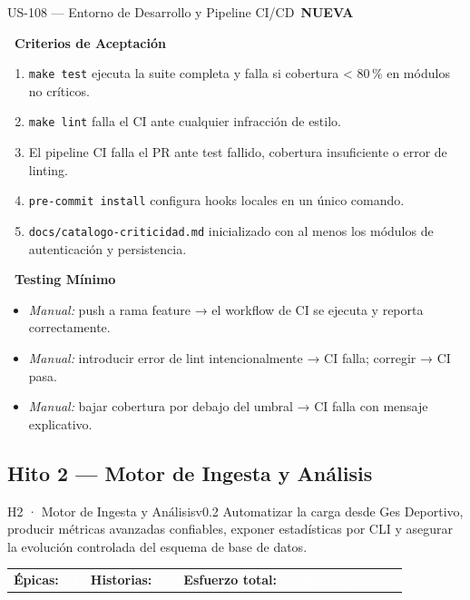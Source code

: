 \documentclass[11pt,a4paper]{article}
\newcommand{\fpath}[1]{\texttt{\small #1}}
\newcommand{\usfield}[2][\;]{%
  \par\vspace{5pt}%
  {\small\textbf{\textcolor{primary}{#2}}}\par\vspace{2pt}%
}
\newcommand{\tagnew}{\,\colorbox{tagnew}{\tiny\bfseries NUEVA}\,}
\begin{document}
\begin{uscard}{US-108 — Entorno de Desarrollo y Pipeline CI/CD \tagnew}
\usfield{\faCheckCircle\ Criterios de Aceptación}
\begin{enumerate}[label=\textcolor{accent}{\textbf{AC\arabic*.}}, nosep, leftmargin=2.2em]
  \item \fpath{make test} ejecuta la suite completa y falla si cobertura < 80\,\% en módulos no críticos.
  \item \fpath{make lint} falla el CI ante cualquier infracción de estilo.
  \item El pipeline CI falla el PR ante test fallido, cobertura insuficiente o error de linting.
  \item \fpath{pre-commit install} configura hooks locales en un único comando.
  \item \fpath{docs/catalogo-criticidad.md} inicializado con al menos los módulos de autenticación y persistencia.
\end{enumerate}

\usfield{\faFlask\ Testing Mínimo}
\begin{itemize}[nosep, leftmargin=1.6em]
  \item \textit{Manual:} push a rama feature → el workflow de CI se ejecuta y reporta correctamente.
  \item \textit{Manual:} introducir error de lint intencionalmente → CI falla; corregir → CI pasa.
  \item \textit{Manual:} bajar cobertura por debajo del umbral → CI falla con mensaje explicativo.
\end{itemize}

\end{uscard}

\subsection{Hito 2 — Motor de Ingesta y Análisis}

\begin{hitobox}{H2 · Motor de Ingesta y Análisis}{v0.2}
\small\textcolor{accentlight}{%
  Automatizar la carga desde Ges Deportivo, producir métricas avanzadas confiables,
  exponer estadísticas por CLI y asegurar la evolución controlada del esquema de base de datos.
}
\par\vspace{4pt}
\begin{tabular}{@{}lllll@{}}
  \textcolor{accentlight}{\small\textbf{Épicas:}} & \textcolor{white}{\small 3} &
  \textcolor{accentlight}{\small\textbf{Historias:}} & \textcolor{white}{\small 5} &
  \textcolor{accentlight}{\small\textbf{Esfuerzo total:}} \textcolor{white}{\small~$\approx$30 días·persona}
\end{tabular}
\end{hitobox}
\end{document}
